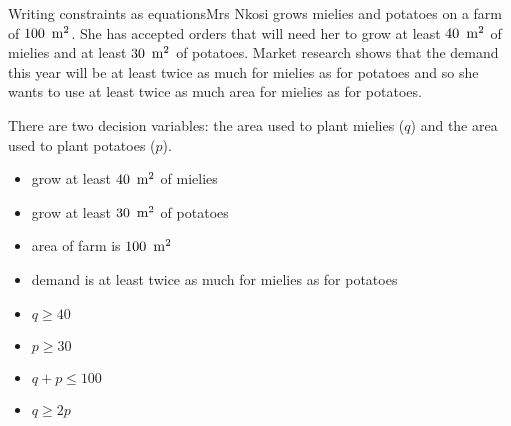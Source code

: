 \begin{wex}{Writing constraints as equations}{Mrs Nkosi grows mielies and potatoes on a farm of $100~\,\rm{m}^2$. She has accepted orders that will need her to grow at least $40~\,\rm{m}^2$ of mielies and at least $30~\,\rm{m}^2$ of potatoes. Market research shows that the demand this year will be at least twice as much for mielies as for potatoes and so she wants to use at least twice as much area for mielies as for potatoes.\\}
{
There are two decision variables: the area used to plant mielies ($q$) and the area used to plant potatoes ($p$).\\

\begin{itemize}
\item{grow at least $40~\,\rm{m}^2$ of mielies}
\item{grow at least $30~\,\rm{m}^2$ of potatoes}
\item{area of farm is $100~\,\rm{m}^2$}
\item{demand is at least twice as much for mielies as for potatoes}
\end{itemize}

\begin{itemize}
\item{$q \geq 40$}
\item{$p \geq 30$}
\item{$q+p \leq 100$}
\item{$q\geq 2p$}
\end{itemize}
}
\end{wex}


